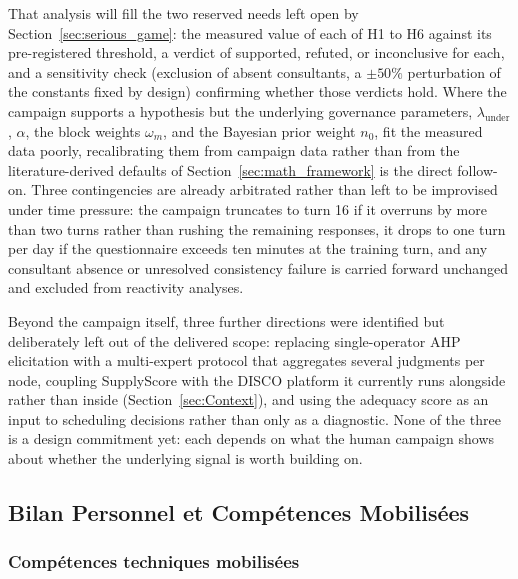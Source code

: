 That analysis will fill the two reserved needs left open by Section~\ref{sec:serious_game}: the measured value of each of H1 to H6 against its pre-registered threshold, a verdict of supported, refuted, or inconclusive for each, and a sensitivity check (exclusion of absent consultants, a $\pm 50\%$ perturbation of the constants fixed by design) confirming whether those verdicts hold. Where the campaign supports a hypothesis but the underlying governance parameters, $\lambda_{\text{under}}$, $\alpha$, the block weights $\omega_m$, and the Bayesian prior weight $n_0$, fit the measured data poorly, recalibrating them from campaign data rather than from the literature-derived defaults of Section~\ref{sec:math_framework} is the direct follow-on. Three contingencies are already arbitrated rather than left to be improvised under time pressure: the campaign truncates to turn 16 if it overruns by more than two turns rather than rushing the remaining responses, it drops to one turn per day if the questionnaire exceeds ten minutes at the training turn, and any consultant absence or unresolved consistency failure is carried forward unchanged and excluded from reactivity analyses.

Beyond the campaign itself, three further directions were identified but deliberately left out of the delivered scope: replacing single-operator AHP elicitation with a multi-expert protocol that aggregates several judgments per node, coupling SupplyScore with the DISCO platform it currently runs alongside rather than inside (Section~\ref{sec:Context}), and using the adequacy score as an input to scheduling decisions rather than only as a diagnostic. None of the three is a design commitment yet: each depends on what the human campaign shows about whether the underlying signal is worth building on.

\subsection{Bilan Personnel et Compétences Mobilisées}

\subsubsection{Compétences techniques mobilisées}

